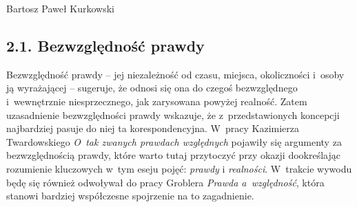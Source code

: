 \begin{artplenv}{Bartosz Paweł Kurkowski}
\subsection{2.1. Bezwzględność prawdy}

Bezwzględność prawdy -- jej niezależność od czasu, miejsca, okoliczności i~osoby ją wyrażającej -- sugeruje, że odnosi się
ona do czegoś bezwzględnego i~wewnętrznie niesprzecznego, jak zarysowana powyżej realność. Zatem uzasadnienie
bezwzględności prawdy wskazuje, że z~przedstawionych koncepcji najbardziej pasuje do niej ta korespondencyjna. W~pracy
Kazimierza Twardowskiego
\parencite*{twardowski_o_1900}
\textit{O~tak zwanych prawdach względnych} pojawiły się argumenty za
bezwzględnością prawdy, które warto tutaj przytoczyć przy okazji dookreślając rozumienie kluczowych w~tym eseju pojęć:
\textit{prawdy }i \textit{realności}. W~trakcie wywodu będę się również odwoływał do pracy Groblera 
\parencite*{grobler_prawda_2000}
\textit{Prawda a~względność}, która stanowi bardziej współczesne spojrzenie na to
zagadnienie.



\end{artplenv}
